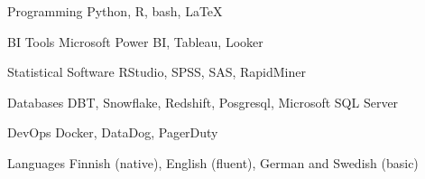 

\begin{cvskills}

  \cvskill
    {Programming} %
    {Python, R, bash, LaTeX} %

  \cvskill
    {BI Tools} %
    {Microsoft Power BI, Tableau, Looker} %

  \cvskill
    {Statistical Software} %
    {RStudio, SPSS, SAS, RapidMiner} %

  \cvskill
    {Databases} %
    {DBT, Snowflake, Redshift, Posgresql, Microsoft SQL Server} %

  \cvskill
    {DevOps} %
    {Docker, DataDog, PagerDuty} %

  \cvskill
    {Languages} %
    {Finnish (native), English (fluent), German and Swedish (basic)} %

\end{cvskills}

